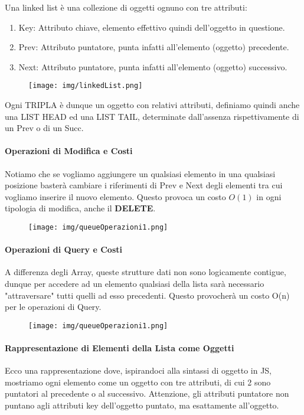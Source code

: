 \documentclass{article}
\begin{document}
Una linked list è una collezione di oggetti ognuno con tre attributi:
\begin{enumerate}
    \item Key: Attributo chiave, elemento effettivo quindi dell'oggetto in questione.
    \item Prev: Attributo puntatore, punta infatti all'elemento (oggetto) precedente.
    \item Next: Attributo puntatore, punta infatti all'elemento (oggetto) successivo.
\end{enumerate}

\begin{figure}[htbp]
    \center
    \texttt{[image: img/linkedList.png]}
\end{figure}

Ogni TRIPLA è dunque un oggetto con relativi attributi, definiamo quindi anche una LIST HEAD ed una LIST TAIL, determinate dall'assenza rispettivamente di un Prev o di un Succ.

\paragraph{Operazioni di Modifica e Costi} Notiamo che se vogliamo aggiungere un qualsiasi elemento in una qualsiasi posizione basterà cambiare i riferimenti di Prev e Next degli elementi tra cui vogliamo inserire il nuovo elemento. Questo provoca un costo \(O(1)\) in ogni tipologia di modifica, anche il \textbf{DELETE}.

\begin{figure}[htbp]
    \center
    \texttt{[image: img/queueOperazioni1.png]}
\end{figure}

\newpage

\paragraph{Operazioni di Query e Costi} A differenza degli Array, queste strutture dati non sono logicamente contigue, dunque per accedere ad un elemento qualsiasi della lista sarà necessario "attraversare" tutti quelli ad esso precedenti.
Questo provocherà un costo O(n) per le operazioni di Query. 

\begin{figure}[htbp]
    \center
    \texttt{[image: img/queueOperazioni1.png]}
\end{figure}

\paragraph{Rappresentazione di Elementi della Lista come Oggetti} Ecco una rappresentazione dove, ispirandoci alla sintassi di oggetto in JS, mostriamo ogni elemento come un oggetto con tre attributi, di cui 2 sono puntatori al precedente o al successivo. Attenzione, gli attributi puntatore non puntano agli attributi key dell'oggetto puntato, ma esattamente all'oggetto.
\end{document}
